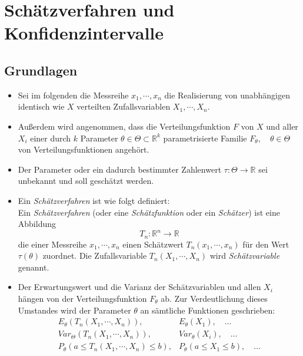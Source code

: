 \documentclass[a4paper, 11pt, accentcolor = tud3b]{tudreport}
\newcommand{\R}{\ensuremath{\mathbb{R}}}
\newcommand{\Var}{\ensuremath{\textit{Var}}}
\begin{document}
    \chapter{Schätzverfahren und Konfidenzintervalle}
        \section{Grundlagen}
            \begin{itemize}
            	\item Sei im folgenden die Messreihe \(x_1, \cdots, x_n\) die Realisierung von unabhängigen identisch wie \(X\) verteilten Zufallsvariablen \(X_1, \cdots, X_n\).
            	\item Außerdem wird angenommen, dass die Verteilungsfunktion \(F\) von \(X\) und aller \(X_i\) einer durch \(k\) Parameter \( \theta \in \Theta \subset \R^k \) parametrisierte Familie \( F_\theta, \quad \theta \in \Theta \) von Verteilungsfunktionen angehört.
            	\item Der Parameter oder ein dadurch bestimmter Zahlenwert \( \tau : \Theta \rightarrow \R \) sei unbekannt und soll geschätzt werden.
            	\item Ein \textit{Schätzverfahren} ist wie folgt definiert: \\ Ein \textit{Schätzverfahren} (oder eine \textit{Schätzfunktion} oder ein \textit{Schätzer}) ist eine Abbildung \[ T_n : \R^n \rightarrow \R \] die einer Messreihe \( x_1, \cdots, x_n \) einen Schätzwert \( T_n(x_1, \cdots, x_n) \) für den Wert \( \tau(\theta) \) zuordnet. Die Zufallsvariable \( T_n(X_1, \cdots, X_n) \) wird \textit{Schätzvariable} genannt.
            	\item Der Erwartungswert und die Varianz der Schätzvariablen und allen \(X_i\) hängen von der Verteilungsfunktion \(F_\theta\) ab. Zur Verdeutlichung dieses Umstandes wird der Parameter \(\theta\) an sämtliche Funktionen geschrieben:
	            	\begin{equation*}
		            	\begin{array}{rl}
		            		              E_\theta(T_n(X_1, \cdots, X_n)), & E_\theta(X_1), \quad \dots               \\
		            		           \Var_\Theta(T_n(X_1, \cdots, X_n)), & \Var_\theta(X_i), \quad \dots            \\
		            		P_\theta(a \leq T_n(X_1, \cdots, X_n) \leq b), & P_\theta(a \leq X_1 \leq b), \quad \dots
		            	\end{array}
	            	\end{equation*}
            \end{itemize}
        
\end{document}
